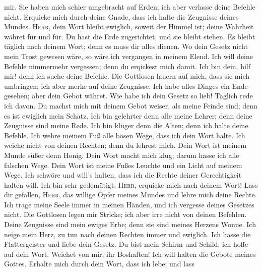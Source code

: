 mir.  Sie haben mich schier umgebracht auf Erden; ich
aber verlasse deine Befehle nicht.  Erquicke mich durch
deine Gnade, dass ich halte die Zeugnisse deines Mundes. 
\textsc{Herr}, dein Wort bleibt ewiglich, soweit der Himmel ist;
 deine Wahrheit währet für und für. Du hast die Erde
zugerichtet, und sie bleibt stehen.  Es bleibt täglich
nach deinem Wort; denn es muss dir alles dienen.  Wo dein
Gesetz nicht mein Trost gewesen wäre, so wäre ich vergangen in meinem
Elend.  Ich will deine Befehle nimmermehr vergessen; denn
du erqickest mich damit.  Ich bin dein, hilf mir! denn
ich suche deine Befehle.  Die Gottlosen lauern auf mich,
dass sie mich umbringen; ich aber merke auf deine Zeugnisse.
 Ich habe alles Dinges ein Ende gesehen; aber dein Gebot
währet.  Wie habe ich dein Gesetz so lieb! Täglich rede
ich davon.  Du machst mich mit deinem Gebot weiser, als
meine Feinde sind; denn es ist ewiglich mein Schatz.  Ich
bin gelehrter denn alle meine Lehrer; denn deine Zeugnisse sind meine
Rede.  Ich bin klüger denn die Alten; denn ich halte
deine Befehle.  Ich wehre meinem Fuß alle bösen Wege,
dass ich dein Wort halte.  Ich weiche nicht von deinen
Rechten; denn du lehrest mich.  Dein Wort ist meinem
Munde süßer denn Honig.  Dein Wort macht mich klug;
darum hasse ich alle falschen Wege.  Dein Wort ist meine
Fußes Leuchte und ein Licht auf meinem Wege.  Ich
schwöre und will's halten, dass ich die Rechte deiner Gerechtigkeit
halten will.  Ich bin sehr gedemütigt; \textsc{Herr},
erquicke mich nach deinem Wort!  Lass dir gefallen,
\textsc{Herr}, das willige Opfer meines Mundes und lehre mich deine
Rechte.  Ich trage meine Seele immer in meinen Händen,
und ich vergesse deines Gesetzes nicht.  Die Gottlosen
legen mir Stricke; ich aber irre nicht von deinen Befehlen.
 Deine Zeugnisse sind mein ewiges Erbe; denn sie sind
meines Herzens Wonne.  Ich neige mein Herz, zu tun nach
deinen Rechten immer und ewiglich.  Ich hasse die
Flattergeister und liebe dein Gesetz.  Du bist mein
Schirm und Schild; ich hoffe auf dein Wort.  Weichet von
mir, ihr Boshaften! Ich will halten die Gebote meines Gottes.
 Erhalte mich durch dein Wort, dass ich lebe; und lass
